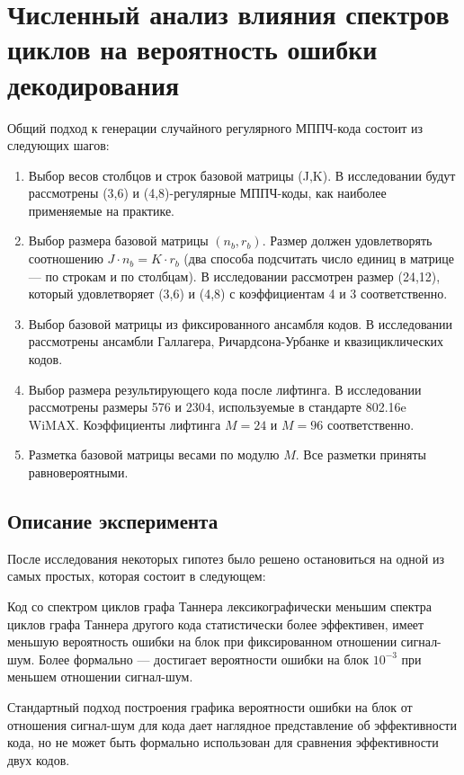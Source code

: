 \chapter{Численный анализ влияния спектров циклов на вероятность ошибки 
декодирования} 

Общий подход к генерации случайного регулярного МППЧ-кода состоит из следующих шагов:
\begin{enumerate}
	\item Выбор весов столбцов и строк базовой матрицы (J,K). В исследовании будут рассмотрены
	(3,6) и (4,8)-регулярные МППЧ-коды, как наиболее применяемые на практике.
	\item Выбор размера базовой матрицы $(n_b,r_b)$. Размер должен удовлетворять соотношению 
	$J \cdot n_b = K \cdot r_b$ (два способа подсчитать число единиц в матрице --- по строкам и по столбцам).
	В исследовании рассмотрен размер (24,12), который удовлетворяет (3,6) и (4,8) с коэффициентам 4 и 3
	соответственно.
	\item Выбор базовой матрицы из фиксированного ансамбля кодов. В исследовании рассмотрены ансамбли
	Галлагера, Ричардсона-Урбанке и квазициклических кодов.
	\item Выбор размера результирующего кода после лифтинга. В исследовании рассмотрены размеры
	576 и 2304, используемые в стандарте 802.16e WiMAX. Коэффициенты лифтинга $M=24$ и $M=96$
	соответственно.
	\item Разметка базовой матрицы весами по модулю $M$. Все разметки приняты равновероятными.
\end{enumerate}

\section{Описание эксперимента}

После исследования некоторых гипотез было решено остановиться на одной из самых простых, которая состоит в
следующем:
\begin{conjecture}
	Код со спектром циклов графа Таннера лексикографически меньшим спектра циклов графа Таннера другого
	кода статистически более эффективен, имеет меньшую вероятность ошибки на блок при фиксированном отношении
	сигнал-шум. Более формально --- достигает вероятности ошибки на блок $10^{-3}$ при меньшем отношении
	сигнал-шум.
\end{conjecture}

Стандартный подход построения графика вероятности ошибки на блок от отношения
сигнал-шум для кода дает наглядное представление об эффективности кода, но не может быть формально использован
для сравнения эффективности двух кодов.

